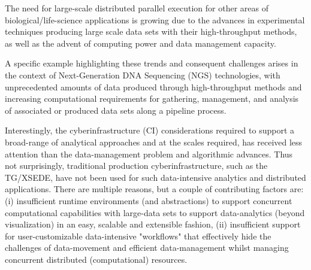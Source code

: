 \documentclass[]{svjour3}
\begin{document}

The need for large-scale distributed parallel execution for other
areas of biological/life-science applications is growing due to the
advances in experimental techniques producing large scale data sets
with their high-throughput methods, as well as the advent of computing
power and data management capacity.



A specific example highlighting these trends and consequent challenges
arises in the context of Next-Generation DNA Sequencing (NGS)
technologies, with unprecedented amounts of data produced through
high-throughput methods and increasing computational requirements for gathering, management, and analysis of associated or produced data sets along a pipeline process. 



Interestingly, the cyberinfrastructure (CI) considerations required to
support a broad-range of analytical approaches and at the scales
required, has received less attention than the data-management problem
and algorithmic advances. Thus not surprisingly, traditional
production cyberinfrastructure, such as the TG/XSEDE, have not been used for
such data-intensive analytics and distributed applications. There are
multiple reasons, but a couple of contributing factors are: (i)
insufficient runtime environments (and abstractions) to support
concurrent computational capabilities with large-data sets to support
data-analytics (beyond visualization) in an easy, scalable and
extensible fashion, (ii) insufficient support for user-customizable
data-intensive "workflows" that effectively hide the challenges of
data-movement and efficient data-management whilst managing concurrent
distributed (computational) resources.
\end{document}

